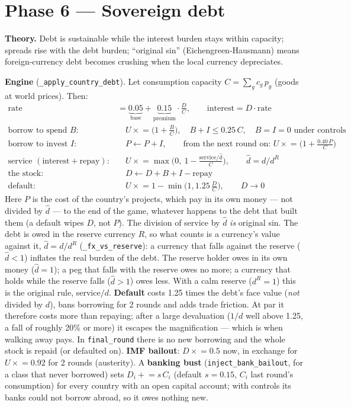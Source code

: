 \documentclass[11pt]{article}
\newcommand{\code}[1]{\texttt{#1}}
\begin{document}
\section{Phase 6 --- Sovereign debt}
\textbf{Theory.} Debt is sustainable while the interest burden stays within
capacity; spreads rise with the debt burden; ``original sin'' (Eichengreen-Hausmann)
means foreign-currency debt becomes crushing when the local currency depreciates.

\textbf{Engine} (\code{\_apply\_country\_debt}). Let consumption capacity
$C = \sum_g c_g\, p_g$ (goods at world prices). Then:
\begin{align*}
\text{rate} &= \underbrace{0.05}_{\text{base}} + \underbrace{0.15}_{\text{premium}}\cdot \frac{D}{C}, \qquad
\text{interest} = D\cdot\text{rate} \\
\text{borrow to spend } B:&\quad U \mathrel{\times}= \Big(1 + \tfrac{B}{C}\Big), \quad
  B + I \le 0.25\,C, \quad B = I = 0 \text{ under controls} \\
\text{borrow to invest } I:&\quad P \leftarrow P + I, \qquad
  \text{from the next round on: } U \mathrel{\times}= \Big(1 + \tfrac{0.40\,P}{C}\Big) \\
\text{service } (\text{interest}+\text{repay}):&\quad
U \mathrel{\times}= \max\!\Big(0,\ 1 - \tfrac{\text{service}/\hat d}{C}\Big), \qquad
\hat d = d / d^{R} \\
\text{the stock}:&\quad D \leftarrow D + B + I - \text{repay} \\
\text{default}:&\quad U \mathrel{\times}= 1 - \min\!\Big(1, 1.25\,\tfrac{D}{C}\Big),
  \qquad D \to 0
\end{align*}
Here $P$ is the cost of the country's projects, which pay in its own money ---
not divided by $\hat d$ --- to the end of the game, whatever happens to the debt
that built them (a default wipes $D$, not $P$).
The division of service by $\hat d$ \emph{is} original sin. The debt is owed in
the reserve currency $R$, so what counts is a currency's value against it,
$\hat d = d/d^{R}$ (\code{\_fx\_vs\_reserve}): a currency that falls against the
reserve ($\hat d<1$) inflates the real burden of the debt. The reserve holder owes
in its own money ($\hat d=1$); a peg that falls with the reserve owes no more; a
currency that holds while the reserve falls ($\hat d>1$) owes less. With a calm
reserve ($d^{R}=1$) this is the original rule, service$/d$. \textbf{Default} costs 1.25 times
the debt's face value (\emph{not} divided by $d$), bans borrowing for 2 rounds and
adds trade friction. At par it therefore costs more than repaying; after a large
devaluation ($1/d$ well above 1.25, a fall of roughly 20\% or more) it escapes the
magnification --- which is when walking away pays. In \code{final\_round} there is no new borrowing and the
whole stock is repaid (or defaulted on). \textbf{IMF bailout}:
$D \mathrel{\times}= 0.5$ now, in exchange for $U \mathrel{\times}= 0.92$ for 2
rounds (austerity). A \textbf{banking bust} (\code{inject\_bank\_bailout}, for a
class that never borrowed) sets $D_i \mathrel{+}= s\,C_i$ (default $s = 0.15$, $C_i$
last round's consumption) for every country with an open capital account; with
controls its banks could not borrow abroad, so it owes nothing new.
\end{document}
